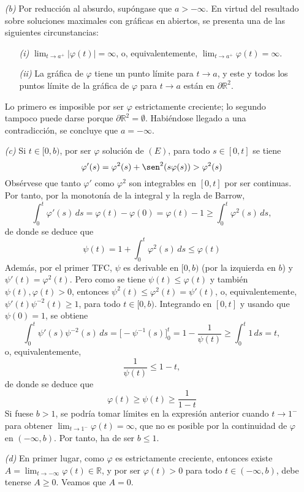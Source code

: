 \documentclass[11pt]{report}
\newcommand{\R}{\mathbb R}
\begin{document}
\begin{itemize}
    \item[\textit{(b)}] Por reducción al absurdo, supóngase que $a > - \infty$. En virtud del resultado sobre soluciones maximales con gráficas en abiertos, se presenta una de las siguientes circunstancias:
    \begin{itemize}
        \item[\textit{(i)}] $\displaystyle \lim_{t \to a^+} |\varphi(t)|=\infty$, o, equivalentemente, $\displaystyle \lim_{t \to a^+}\varphi(t)=\infty$.
        \item[\textit{(ii)}] La gráfica de $\varphi$ tiene un punto límite para $t \to a$, y este y todos los puntos límite de la gráfica de $\varphi$ para $t \to a$ están en $\partial \R^2$.
    \end{itemize}
    Lo primero es imposible por ser $\varphi$ estrictamente creciente; lo segundo tampoco puede darse porque $\partial \R^2 = \emptyset$. Habiéndose llegado a una contradicción, se concluye que $a = -\infty$.
    \item[\textit{(c)}] Si $t \in [0,b)$, por ser $\varphi$ solución de $(E)$, para todo $s \in [0,t]$ se tiene
        \[\varphi'(s)=\varphi^2(s)+\sen^2(s\varphi(s)) > \varphi^2(s)\]
        Obsérvese que tanto $\varphi'$ como $\varphi^2$ son integrables en $[0,t]$ por ser continuas. Por tanto, por la monotonía de la integral y la regla de Barrow,
        \[\int_0^t \varphi'(s) \, ds = \varphi(t)-\varphi(0)=\varphi(t)-1 \geq \int_0^t \varphi^2(s) \, ds,\]
        de donde se deduce que
        \[\psi(t)=1+\int_0^t \varphi^2(s) \, ds \leq \varphi(t)\]
        Además, por el primer TFC, $\psi$ es derivable en $[0,b)$ (por la izquierda en $b$) y $\psi'(t)=\varphi^2(t)$. Pero como se tiene $\psi(t) \leq \varphi(t)$ y también $\psi(t),\varphi(t)>0$, entonces $\psi^2(t) \leq \varphi^2(t)=\psi'(t)$, o, equivalentemente, $\psi'(t)\psi^{-2}(t) \geq 1$, para todo $t \in [0,b)$. Integrando en $[0,t]$ y usando que $\psi(0)=1$, se obtiene
        \[\int_0^t \psi'(s)\psi^{-2}(s)\, ds = \bigl[-\psi^{-1}(s)\bigr]_0^t = 1-\frac{1}{\psi(t)} \geq \int_0^t 1 \, ds = t,\]
        o, equivalentemente,
        \[\frac{1}{\psi(t)} \leq 1-t,\]
        de donde se deduce que
        \[\varphi(t) \geq \psi(t) \geq \frac{1}{1-t}\]
        Si fuese $b > 1$, se podría tomar límites en la expresión anterior cuando $t \to 1^-$ para obtener $\lim_{t \to 1^-}\varphi(t) = \infty$, que no es posible por la continuidad de $\varphi$ en $(-\infty,b)$. Por tanto, ha de ser $b \leq 1$.
    \item[\textit{(d)}] En primer lugar, como $\varphi$ es estrictamente creciente, entonces existe $A = \lim_{t \to -\infty} \varphi(t) \in \R$, y por ser $\varphi(t)>0$ para todo $t \in (-\infty,b)$, debe tenerse $A \geq 0$. Veamos que $A = 0$.


\end{itemize}
\end{document}

